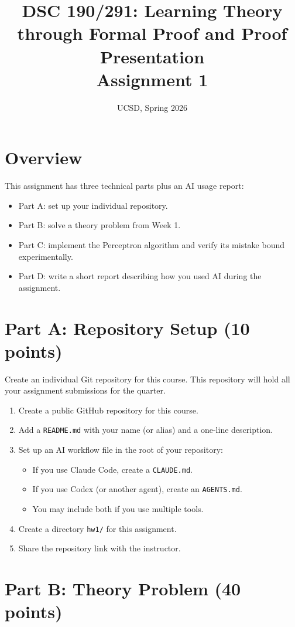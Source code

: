 \documentclass{article}
\title{DSC 190/291: Learning Theory through Formal Proof and Proof Presentation\\Assignment 1}
\date{UCSD, Spring 2026}
\begin{document}
\maketitle

\section{Overview}

This assignment has three technical parts plus an AI usage report:
\begin{itemize}
\item Part A: set up your individual repository.
\item Part B: solve a theory problem from Week 1.
\item Part C: implement the Perceptron algorithm and verify its mistake bound experimentally.
\item Part D: write a short report describing how you used AI during the assignment.
\end{itemize}

\section{Part A: Repository Setup (10 points)}

Create an individual Git repository for this course. This repository will hold all your assignment submissions for the quarter.

\begin{enumerate}
\item Create a public GitHub repository for this course.
\item Add a \texttt{README.md} with your name (or alias) and a one-line description.
\item Set up an AI workflow file in the root of your repository:
\begin{itemize}
\item If you use Claude Code, create a \texttt{CLAUDE.md}.
\item If you use Codex (or another agent), create an \texttt{AGENTS.md}.
\item You may include both if you use multiple tools.
\end{itemize}
\item Create a directory \texttt{hw1/} for this assignment.
\item Share the repository link with the instructor.
\end{enumerate}

\section{Part B: Theory Problem (40 points)}
\end{document}

